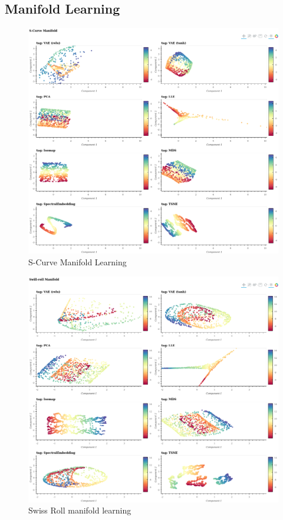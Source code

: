 \documentclass[12pt]{article}
\begin{document}
\subsection{Manifold Learning}
\begin{figure}[!htb]
    \includegraphics[scale =0.3]{../../media/03-scurve-latent.png}
    \caption{S-Curve Manifold Learning}
    \label{fig:scurve}
\end{figure}


\begin{figure}[!hb]
\includegraphics[scale = 0.3]{../../media/03-swissroll-latent.png}
    \caption{Swiss Roll manifold learning}
    \label{fig:swissroll}
\end{figure}
\end{document}
